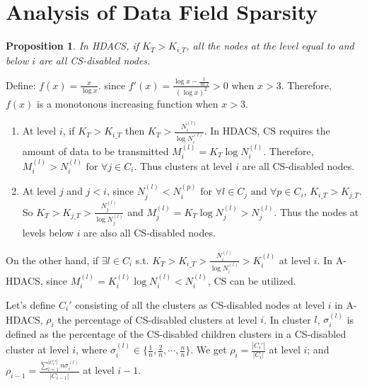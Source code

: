 \documentclass[conference]{IEEEtran}
\begin{document}
\section{Analysis of Data Field Sparsity}\label{ana_sparsity}
\newtheorem{prop}{Proposition}\label{prop1}
\begin{prop}
 In HDACS, if $K_T>K_{i\_T}$, all the nodes at the level equal to and below
 $i$ are all CS-disabled nodes. 
\end{prop}
\begin{IEEEproof}
  Define: $f(x)=\frac{x}{\log{x}}$. since $f'(x)=\frac{\log{x}-\frac{1}{\ln{2}}}{(\log{x})^2}>0 \text{ when } 
  x>3$. Therefore, $f(x)$ is a monotonous increasing function when $x>3$.
  \begin{enumerate}
  \item At level $i$, if $K_T>K_{i\_T}$ then $K_T> \frac{N_i^{(l)}}{\log{N_i^{(l)}}}$. In HDACS, CS requires 
	the amount of data to be transmitted $M_i^{(l)} = K_T \log{N_i^{(l)}}$.
        Therefore, $M_i^{(l)} > N_i^{(l)} \text{ for } \forall j \in C_i$. Thus clusters at level $i$ are all CS-disabled nodes.
  
  \item At level $j$ and $j<i$, since $N_j^{(l)} < N_i^{(p)}  \text{ for } \forall l\in C_j \text{ and } \forall p \in C_i$, 
  $K_{i\_T}>K_{j\_T}$. So $K_T>K_{j\_T}>\frac{N_j^{(l)}}{\log{N_j^{(l)}}}$ and $M_j^{(l)} = K_T \log{N_j^{(l)}} > 
  N_j^{(l)}$. Thus the nodes at levels below $i$ are also all CS-disabled nodes.
  \end{enumerate}
\end{IEEEproof}

On the other hand, if $\exists l \in C_i $ s.t. $K_T > K_{i\_T} > \frac{N_i^{(l)}}{\log{N_i^{(l)}}} > K_i^{(l)}$ at level 
$i$. In A-HDACS, since $M_i^{(l)}=K_i^{(l)} \log{N_i^{(l)}} < N_i^{(l)}$,  CS can be utilized. 

Let's define $C_i'$ consisting of all the clusters as CS-disabled nodes at level $i$ in A-HDACS, 
 $\rho_i$ the percentage of CS-disabled clusters at level $i$. In cluster 
 $l$, $\sigma_i^{(l)}$ is defined as the percentage of the CS-disabled children clusters in a CS-disabled 
cluster at level $i$, where $\sigma_i^{(l)} \in \{\frac{1}{n},\frac{2}{n},\cdots, \frac{n}{n} 
\}$. We get $ \rho_i = \frac{|C_i'|}{|C_i|}$ at level $i$; and 
$\rho_{i-1}=\frac{\sum_{l=1}^{|C_i'|} n \sigma_i^{(l)}}{|C_{i-1}|}$ at level $i-1$. 
\end{document}
